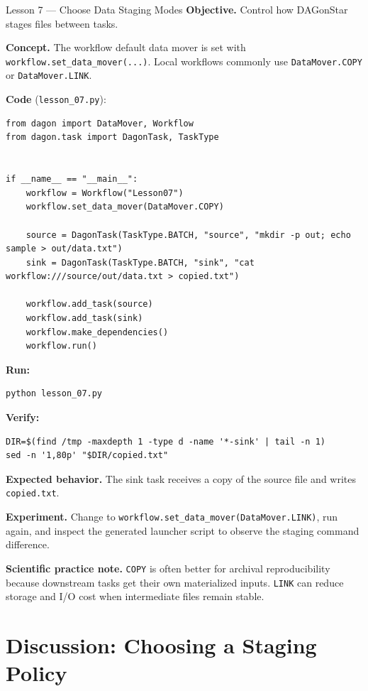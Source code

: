 \begin{lessonbox}{Lesson 7 --- Choose Data Staging Modes}
\textbf{Objective.} Control how DAGonStar stages files between tasks.

\textbf{Concept.} The workflow default data mover is set with
\texttt{workflow.set\_data\_mover(...)}. Local workflows commonly use
\texttt{DataMover.COPY} or \texttt{DataMover.LINK}.

\textbf{Code} (\texttt{lesson\_07.py}):
\begin{lstlisting}
from dagon import DataMover, Workflow
from dagon.task import DagonTask, TaskType


if __name__ == "__main__":
    workflow = Workflow("Lesson07")
    workflow.set_data_mover(DataMover.COPY)

    source = DagonTask(TaskType.BATCH, "source", "mkdir -p out; echo sample > out/data.txt")
    sink = DagonTask(TaskType.BATCH, "sink", "cat workflow:///source/out/data.txt > copied.txt")

    workflow.add_task(source)
    workflow.add_task(sink)
    workflow.make_dependencies()
    workflow.run()
\end{lstlisting}

\textbf{Run:}
\begin{lstlisting}[style=bash]
python lesson_07.py
\end{lstlisting}

\textbf{Verify:}
\begin{lstlisting}[style=bash]
DIR=$(find /tmp -maxdepth 1 -type d -name '*-sink' | tail -n 1)
sed -n '1,80p' "$DIR/copied.txt"
\end{lstlisting}

\textbf{Expected behavior.} The sink task receives a copy of the source file
and writes \texttt{copied.txt}.

\textbf{Experiment.} Change to \texttt{workflow.set\_data\_mover(DataMover.LINK)},
run again, and inspect the generated launcher script to observe the staging
command difference.

\textbf{Scientific practice note.} \texttt{COPY} is often better for archival
reproducibility because downstream tasks get their own materialized inputs.
\texttt{LINK} can reduce storage and I/O cost when intermediate files remain
stable.
\end{lessonbox}

\section{Discussion: Choosing a Staging Policy}

